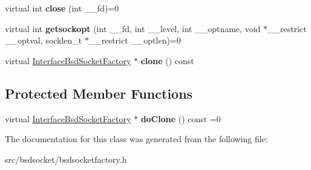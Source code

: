 \begin{DoxyCompactItemize}
\item 
\mbox{\label{classInterfaceBsdSocketFactory_a2cb114ed8514fdb9a5a231a14e36ef5a}} 
virtual int {\bfseries close} (int \+\_\+\+\_\+fd)=0
\item 
\mbox{\label{classInterfaceBsdSocketFactory_a6081647e7bcffdb4af53cc71ff42f792}} 
virtual int {\bfseries getsockopt} (int \+\_\+\+\_\+fd, int \+\_\+\+\_\+level, int \+\_\+\+\_\+optname, void $\ast$\+\_\+\+\_\+restrict \+\_\+\+\_\+optval, socklen\+\_\+t $\ast$\+\_\+\+\_\+restrict \+\_\+\+\_\+optlen)=0
\item 
\mbox{\label{classInterfaceBsdSocketFactory_aa58c4e561966713dc3b64c31a7d65adb}} 
virtual \hyperlink{classInterfaceBsdSocketFactory}{Interface\+Bsd\+Socket\+Factory} $\ast$ {\bfseries clone} () const
\end{DoxyCompactItemize}
\subsection*{Protected Member Functions}
\begin{DoxyCompactItemize}
\item 
\mbox{\label{classInterfaceBsdSocketFactory_aa6918ad69cb7f660a8e79643f2ebe8ef}} 
virtual \hyperlink{classInterfaceBsdSocketFactory}{Interface\+Bsd\+Socket\+Factory} $\ast$ {\bfseries do\+Clone} () const =0
\end{DoxyCompactItemize}


The documentation for this class was generated from the following file\+:\begin{DoxyCompactItemize}
\item 
src/bsdsocket/bsdsocketfactory.\+h\end{DoxyCompactItemize}
